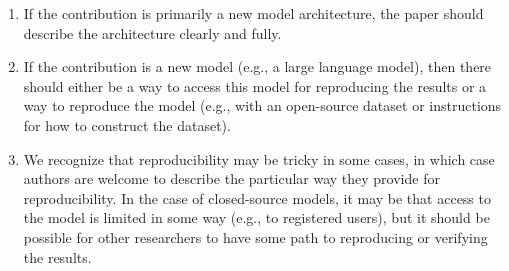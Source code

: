 \documentclass{article}
\theoremstyle{plain}
\theoremstyle{definition}
\theoremstyle{remark}
\theoremstyle{plain}
\begin{document}
\begin{enumerate}
\begin{itemize}
\begin{enumerate}
            \item If the contribution is primarily a new model architecture, the paper should describe the architecture clearly and fully.
            \item If the contribution is a new model (e.g., a large language model), then there should either be a way to access this model for reproducing the results or a way to reproduce the model (e.g., with an open-source dataset or instructions for how to construct the dataset).
            \item We recognize that reproducibility may be tricky in some cases, in which case authors are welcome to describe the particular way they provide for reproducibility. In the case of closed-source models, it may be that access to the model is limited in some way (e.g., to registered users), but it should be possible for other researchers to have some path to reproducing or verifying the results.
        \end{enumerate}
    \end{itemize}



\end{enumerate}
\end{document}
